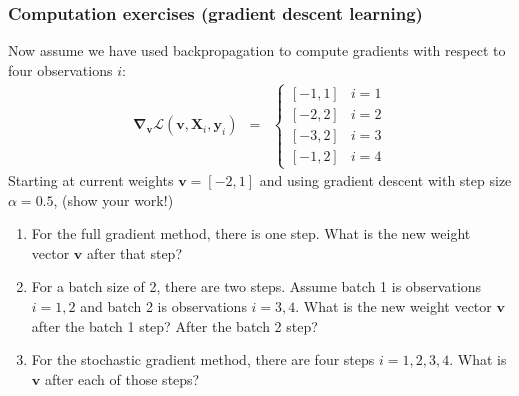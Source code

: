 \documentclass{beamer}
\begin{document}
\begin{frame}
  \frametitle{Computation exercises (gradient descent learning)}
  Now assume we have used backpropagation to compute gradients with
  respect to four observations $i$:
  \begin{eqnarray*}
    \mathbf \nabla_{\mathbf v}
    \mathcal L(\mathbf v, \mathbf X_i,\mathbf y_i)
    &=& \begin{cases}
      [-1, 1] & i=1\\
      [-2, 2] & i=2\\
      [-3, 2] & i=3\\
      [-1, 2] & i=4
    \end{cases} 
  \end{eqnarray*}
  Starting at current weights $\mathbf v=[-2, 1]$ and using gradient descent
  with step size $\alpha=0.5$,   (show your work!)

  \begin{enumerate}
  \item For the full gradient method, there is one step. What is the
    new weight vector $\mathbf v$ after that step?
  \item For a batch size of 2, there are two steps. Assume batch 1 is
    observations $i=1,2$ and batch 2 is observations $i=3,4$. What is the new
    weight vector $\mathbf v$ after the batch 1 step? After the batch
    2 step?
  \item For the stochastic gradient method, there are four steps
    $i=1,2,3,4$. What is $\mathbf v$ after each
    of those steps?
  \end{enumerate}
\end{frame}
\end{document}
